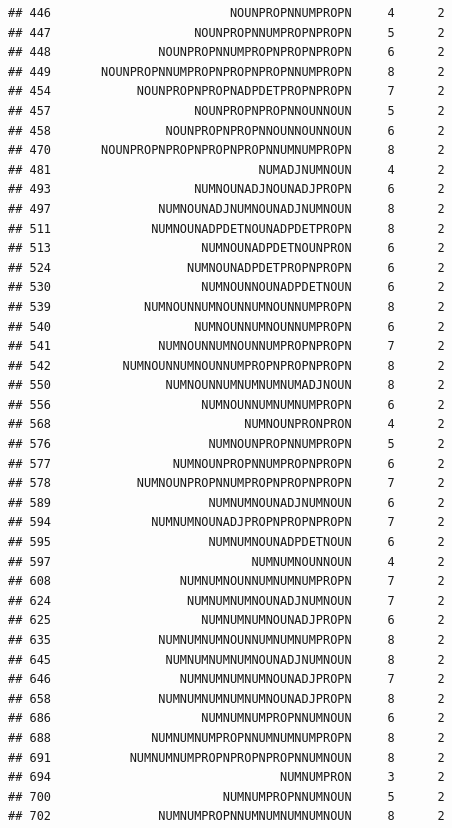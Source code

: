 \documentclass[]{article}
\begin{document}
\begin{verbatim}
## 446                         NOUNPROPNNUMPROPN     4      2
## 447                    NOUNPROPNNUMPROPNPROPN     5      2
## 448               NOUNPROPNNUMPROPNPROPNPROPN     6      2
## 449       NOUNPROPNNUMPROPNPROPNPROPNNUMPROPN     8      2
## 454            NOUNPROPNPROPNADPDETPROPNPROPN     7      2
## 457                    NOUNPROPNPROPNNOUNNOUN     5      2
## 458                NOUNPROPNPROPNNOUNNOUNNOUN     6      2
## 470       NOUNPROPNPROPNPROPNPROPNNUMNUMPROPN     8      2
## 481                             NUMADJNUMNOUN     4      2
## 493                    NUMNOUNADJNOUNADJPROPN     6      2
## 497               NUMNOUNADJNUMNOUNADJNUMNOUN     8      2
## 511              NUMNOUNADPDETNOUNADPDETPROPN     8      2
## 513                     NUMNOUNADPDETNOUNPRON     6      2
## 524                   NUMNOUNADPDETPROPNPROPN     6      2
## 530                     NUMNOUNNOUNADPDETNOUN     6      2
## 539             NUMNOUNNUMNOUNNUMNOUNNUMPROPN     8      2
## 540                    NUMNOUNNUMNOUNNUMPROPN     6      2
## 541               NUMNOUNNUMNOUNNUMPROPNPROPN     7      2
## 542          NUMNOUNNUMNOUNNUMPROPNPROPNPROPN     8      2
## 550                NUMNOUNNUMNUMNUMNUMADJNOUN     8      2
## 556                     NUMNOUNNUMNUMNUMPROPN     6      2
## 568                           NUMNOUNPRONPRON     4      2
## 576                      NUMNOUNPROPNNUMPROPN     5      2
## 577                 NUMNOUNPROPNNUMPROPNPROPN     6      2
## 578            NUMNOUNPROPNNUMPROPNPROPNPROPN     7      2
## 589                      NUMNUMNOUNADJNUMNOUN     6      2
## 594              NUMNUMNOUNADJPROPNPROPNPROPN     7      2
## 595                      NUMNUMNOUNADPDETNOUN     6      2
## 597                            NUMNUMNOUNNOUN     4      2
## 608                  NUMNUMNOUNNUMNUMNUMPROPN     7      2
## 624                   NUMNUMNUMNOUNADJNUMNOUN     7      2
## 625                     NUMNUMNUMNOUNADJPROPN     6      2
## 635               NUMNUMNUMNOUNNUMNUMNUMPROPN     8      2
## 645                NUMNUMNUMNUMNOUNADJNUMNOUN     8      2
## 646                  NUMNUMNUMNUMNOUNADJPROPN     7      2
## 658               NUMNUMNUMNUMNUMNOUNADJPROPN     8      2
## 686                     NUMNUMNUMPROPNNUMNOUN     6      2
## 688              NUMNUMNUMPROPNNUMNUMNUMPROPN     8      2
## 691           NUMNUMNUMPROPNPROPNPROPNNUMNOUN     8      2
## 694                                NUMNUMPRON     3      2
## 700                        NUMNUMPROPNNUMNOUN     5      2
## 702               NUMNUMPROPNNUMNUMNUMNUMNOUN     8      2

\end{verbatim}
\end{document}
